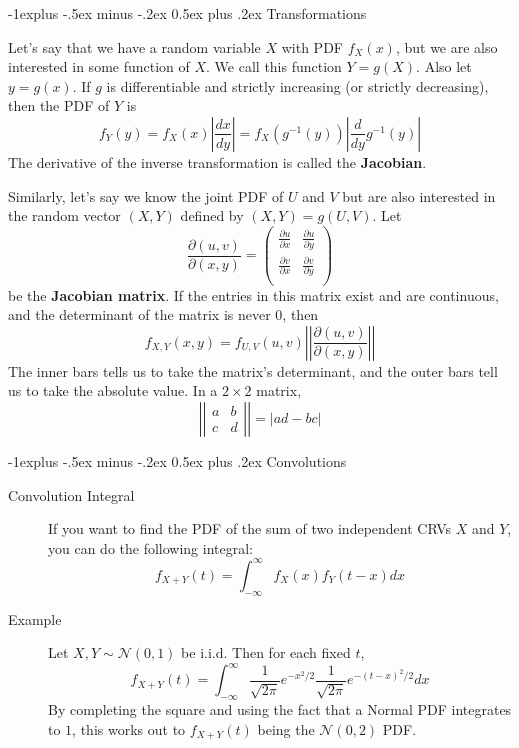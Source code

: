 \documentclass[10pt,landscape]{article}
\makeatletter
\newcommand{\N}{\mathcal{N}}
\renewcommand{\subsection}{\@startsection{subsection}{2}{0mm}%
                                {-1explus -.5ex minus -.2ex}%
                                {0.5ex plus .2ex}%
                                {\normalfont\normalsize\bfseries}}
\makeatother
\begin{document}
\begin{multicols*}{3}
\subsection{Transformations}
\begin{description}
    \label{one variable transformations}
    \item[One Variable Transformations] Let's say that we have a random variable $X$ with PDF $f_X(x)$, but we are also interested in some function of $X$. We call this function $Y = g(X)$. Also let $y=g(x)$. If $g$ is differentiable and strictly increasing (or strictly decreasing), then the PDF of $Y$ is
    \[f_Y(y) = f_X(x)\left|\frac{dx}{dy}\right| =  f_X(g^{-1}(y))\left|\frac{d}{dy}g^{-1}(y)\right|\]
    The derivative of the inverse transformation is called the \textbf{Jacobian}.


     \item[Two Variable Transformations] Similarly, let's say we know the joint PDF of $U$ and $V$ but are also interested in the random vector $(X, Y)$ defined by $(X, Y) = g(U, V)$. Let 
       $$  \frac{\partial (u,v)}{\partial (x,y)}  = \begin{pmatrix} 
              \frac{\partial u}{\partial x} &  \frac{\partial u}{\partial y} \\
           \frac{\partial v}{\partial x} & \frac{\partial v}{\partial y}   \\
        \end{pmatrix}$$
     be the \textbf{Jacobian matrix}. If the entries in this matrix exist and are continuous, and the determinant of the matrix is never $0$, then
     \[f_{X,Y}(x, y) = f_{U,V}(u,v) \left|\left|   \frac{\partial (u,v)}{\partial (x,y)}\right| \right| \]
   The inner bars tells us to take the matrix's determinant, and the outer bars tell us to take the absolute value.  In a $2 \times 2$ matrix, 
     \[ \left| \left|
     \begin{array}{ccc}
         a & b \\
         c & d
     \end{array}
     \right| \right| = |ad - bc|\]

\end{description}

\label{convolutions}
\subsection{Convolutions}
\begin{description}
    \item[Convolution Integral] If you want to find the PDF of the sum of two independent CRVs $X$ and $Y$, you can do the following integral:
        \[f_{X+Y}(t)=\int_{-\infty}^\infty f_X(x)f_Y(t-x)dx\]
    \item[Example] Let $X,Y \sim \N(0,1)$ be i.i.d. Then for each fixed $t$,\[f_{X+Y}(t)=\int_{-\infty}^\infty \frac{1}{\sqrt{2\pi}}e^{-x^2/2} \frac{1}{\sqrt{2\pi}}e^{-(t-x)^2/2} dx\]
By completing the square and using the fact that a Normal PDF integrates to $1$, this works out to $f_{X+Y}(t)$ being the $\N(0,2)$ PDF.
\end{description}


\end{multicols*}
\end{document}
